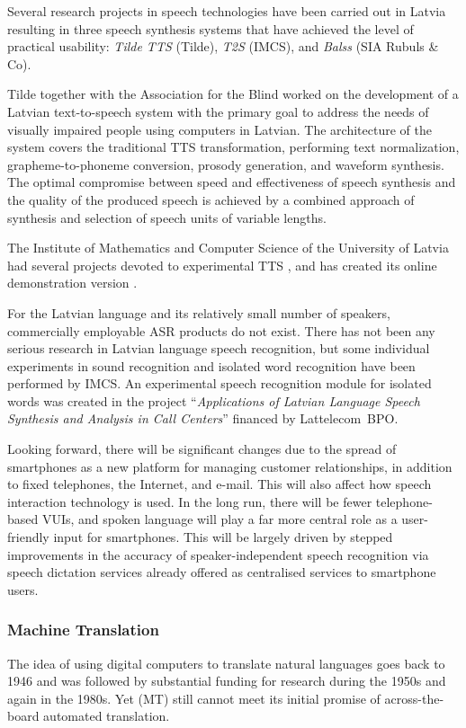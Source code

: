\begin{multicols}{2}
Several research projects in speech technologies have been carried out in Latvia resulting in three speech synthesis systems that have achieved the level of practical usability: \textit{Tilde TTS} (Tilde), \textit{T2S} (IMCS), and \textit{Balss} (SIA Rubuls \& Co). 

Tilde together with the Association for the Blind worked on the development of a Latvian text-to-speech system \cite{Meta19} with the primary goal to address the needs of visually impaired people using computers in Latvian.
The architecture of the system covers the traditional TTS transformation, performing text normalization, grapheme-to-phoneme conversion, prosody generation, and waveform synthesis.
The optimal compromise between speed and effectiveness of speech synthesis and the quality of the produced speech is achieved by a combined approach of synthesis and selection of speech units of variable lengths.

The Institute of Mathematics and Computer Science of the University of Latvia had several projects devoted to experimental TTS \cite{Meta20}, \cite{Meta21} and has created its online demonstration version \cite{Meta22}.

For the Latvian language and its relatively small number of speakers, commercially employable ASR products do not exist.
There has not been any serious research in Latvian language speech recognition, but some individual experiments in sound recognition and isolated word recognition have been performed by IMCS.
An experimental speech recognition module for isolated words was created in the project ``\textit{Applications of Latvian Language Speech Synthesis and Analysis in Call Centers}'' financed by Lattelecom~BPO.

Looking forward, there will be significant changes due to the spread of smartphones as a new platform for managing customer relationships, in addition to fixed telephones, the Internet, and e-mail.
This will also affect how speech interaction technology is used.
In the long run, there will be fewer telephone-based VUIs, and spoken language will play a far more central role as a user-friendly input for smartphones.
This will be largely driven by stepped improvements in the accuracy of speaker-independent speech recognition via speech dictation services already offered as centralised services to smartphone users. 

\subsubsection{Machine Translation}
The idea of using digital computers to translate natural languages goes back to 1946 and was followed by substantial funding for research during the 1950s and again in the 1980s.
Yet  (MT) still cannot meet its initial promise of across-the-board automated translation.  


\end{multicols}
